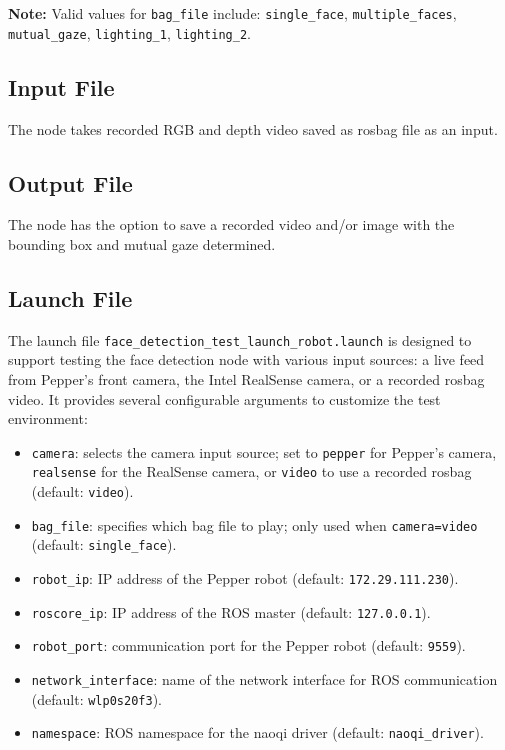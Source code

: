\documentclass{CSSRforAfrica}
\begin{document}
{\noindent \textbf{Note:} Valid values for \texttt{bag\_file} include:  
\texttt{single\_face}, \texttt{multiple\_faces}, \texttt{mutual\_gaze}, \texttt{lighting\_1}, \texttt{lighting\_2}.

\subsection*{Input File}
The node takes recorded RGB and depth video saved as rosbag file as an input. 

\subsection*{Output File}
The node has the option to save a recorded video and/or image with the bounding box and mutual gaze determined.
\textsf{\textsf{}}
\subsection*{Launch File}
The launch file \texttt{face\_detection\_test\_launch\_robot.launch} is designed to support testing the face detection node with various input sources: a live feed from Pepper’s front camera, the Intel RealSense camera, or a recorded rosbag video. It provides several configurable arguments to customize the test environment:

\begin{itemize}
	\setlength\itemsep{0em}
	\item \texttt{camera}: selects the camera input source; set to \texttt{pepper} for Pepper's camera, \texttt{realsense} for the RealSense camera, or \texttt{video} to use a recorded rosbag (default: \texttt{video}).
	\item \texttt{bag\_file}: specifies which bag file to play; only used when \texttt{camera=video} (default: \texttt{single\_face}).
	\item \texttt{robot\_ip}: IP address of the Pepper robot (default: \texttt{172.29.111.230}).
	\item \texttt{roscore\_ip}: IP address of the ROS master (default: \texttt{127.0.0.1}).
	\item \texttt{robot\_port}: communication port for the Pepper robot (default: \texttt{9559}).
	\item \texttt{network\_interface}: name of the network interface for ROS communication (default: \texttt{wlp0s20f3}).
	\item \texttt{namespace}: ROS namespace for the naoqi driver (default: \texttt{naoqi\_driver}).
\end{itemize}

}
\end{document}
